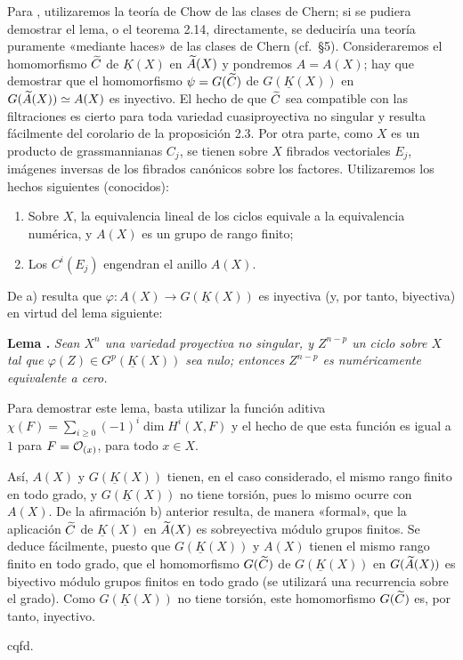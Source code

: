 Para , utilizaremos la teoría de Chow de las clases de Chern; si se pudiera demostrar el lema, o el teorema 2.14, directamente, se deduciría una teoría puramente «mediante haces» de las clases de Chern (cf.\ \S 5). Consideraremos el homomorfismo $\Ctil$ de $\underline K(X)$ en $\Atil(X)$ y pondremos $A=A(X)$; hay que demostrar que el homomorfismo $\psi=G(\Ctil)$ de $G(\underline K(X))$ en $G(\sisi{A(X)}{\Atil(X)})\simeq A(X)$ es inyectivo. El hecho de que $\Ctil$ sea compatible con las filtraciones es cierto para toda variedad cuasiproyectiva no singular y resulta fácilmente del corolario de la proposición 2.3. Por otra parte, como $X$ es un producto de grassmannianas $C_j$, se tienen sobre $X$ fibrados vectoriales $E_j$, imágenes inversas de los fibrados canónicos sobre los factores. Utilizaremos los hechos siguientes (conocidos):
\begin{enumerate}[label=\alph*)]
\item Sobre $X$, la equivalencia lineal de los ciclos equivale a la equivalencia numérica, y $A(X)$ es un grupo de rango finito;
\item Los $C^i(E_j)$ engendran el anillo $A(X)$.
\end{enumerate}
De a) resulta que $\varphi:A(X)\longrightarrow G(\underline K(X))$ es inyectiva (y, por tanto, biyectiva) en virtud del lema siguiente:

\textbf{Lema .} \emph{Sean $X^n$ una variedad proyectiva no singular, y $Z^{n-p}$ un ciclo sobre $X$ tal que $\varphi(Z)\in G^p(\underline K(X))$ sea nulo; entonces $Z^{n-p}$ es numéricamente equivalente a cero.}

Para demostrar este lema, basta utilizar la función aditiva $\chi(F)=\sum_{i\geq0}(-1)^i\dim H^i(X,F)$ y el hecho de que esta función es igual a $1$ para $F=\cO_{(x)}$, para todo $x\in X$.

Así, $A(X)$ y $G(\underline K(X))$ tienen, en el caso considerado, el mismo rango finito en todo grado, y $G(\underline K(X))$ no tiene torsión, pues lo mismo ocurre con $A(X)$. De la afirmación b) anterior resulta, de manera «formal», que la aplicación $\Ctil$ de $\underline K(X)$ en $\Atil(X)$ es sobreyectiva módulo grupos finitos. Se deduce fácilmente, puesto que $G(\underline K(X))$ y $A(X)$ tienen el mismo rango finito en todo grado, que el homomorfismo $G(\Ctil)$ de $G(\underline K(X))$ en $G(\Atil(X))$ es biyectivo módulo grupos finitos en todo grado (se utilizará una recurrencia sobre el grado). Como $G(\underline K(X))$ no tiene torsión, este homomorfismo $G(\Ctil)$ es, por tanto, inyectivo.
\begin{flushright}cqfd.\end{flushright}

